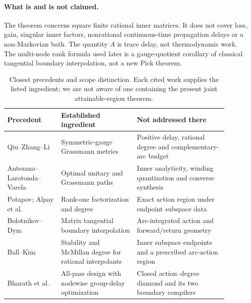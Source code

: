 \documentclass[11pt]{article}
\theoremstyle{definition}
\theoremstyle{remark}
\begin{document}
\paragraph{What is and is not claimed.}
The theorem concerns square finite rational inner matrices.  It does not
cover loss, gain, singular inner factors, nonrational continuous-time
propagation delays or a
non-Markovian bath.  The quantity $A$ is trace delay, not thermodynamic work.
The multi-node rank formula used later is a gauge-quotient corollary of
classical tangential boundary interpolation, not a new Pick theorem.

\begin{table}[t]
\centering
\small
\begin{tabular}{@{}>{\raggedright\arraybackslash}p{0.22\linewidth}
>{\raggedright\arraybackslash}p{0.31\linewidth}
>{\raggedright\arraybackslash}p{0.37\linewidth}@{}}
\toprule
Precedent & Established ingredient & Not addressed there \\
\midrule
Qiu--Zhang--Li \cite{QiuZhangLi2005}
& Symmetric-gauge Grassmann metrics
& Positive delay, rational degree and complementary-arc budget \\
Antezana--Larotonda--Varela \cite{AntezanaLarotondaVarela2014}
& Optimal unitary and Grassmann paths
& Inner analyticity, winding quantization and converse synthesis \\
Potapov; Alpay et al.\ \cite{Potapov1955,AlpayJorgensenLewkowicz2016}
& Rank-one factorization and degree
& Exact action region under endpoint subspace data \\
Bolotnikov--Dym \cite{BolotnikovDym2006}
& Matrix tangential boundary interpolation
& Arc-integrated action and forward/return geometry \\
Ball--Kim \cite{BallKim1994}
& Stability and McMillan degree for rational interpolants
& Inner subspace endpoints and a prescribed arc-action region \\
Bharath et al.\ \cite{BharathEtAl2023}
& All-pass design with nodewise group-delay optimization
& Closed action--degree diamond and its two boundary compilers \\
\bottomrule
\end{tabular}
\caption{Closest precedents and scope distinction.  Each cited work supplies
the listed ingredient; we are not aware of one containing the present joint
attainable-region theorem.}
\label{tab:precedent}
\end{table}
\end{document}

